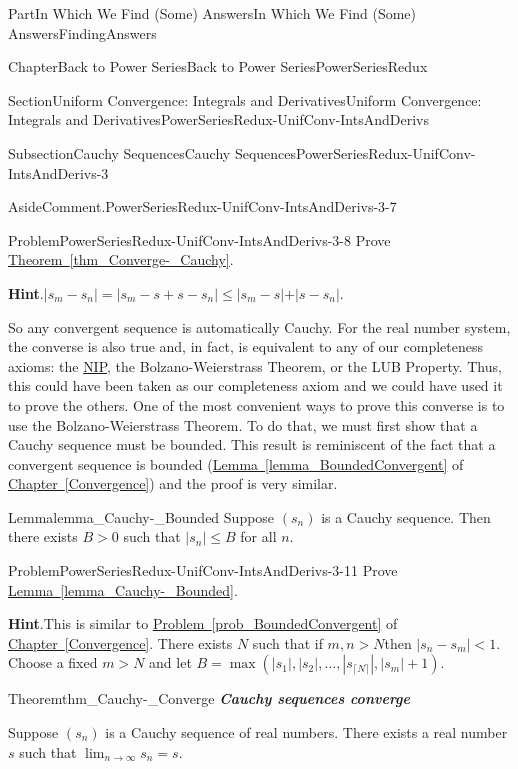 \documentclass[oneside,10pt,]{book}
\newcommand{\blocktitlefont}{\relax}
\newcommand{\xreffont}{\relax}
\newcommand{\alert}[1]{\textbf{\textit{#1}}}
\numberwithin{equation}{part}
\newcommand{\abs}[1]{\left|#1\right|}
\newcommand{\lt}{<}
\begin{document}
\begin{partptx}{Part}{In Which We Find (Some) Answers}{}{In Which We Find (Some) Answers}{}{}{FindingAnswers}
\begin{chapterptx}{Chapter}{Back to Power Series}{}{Back to Power Series}{}{}{PowerSeriesRedux}
\begin{sectionptx}{Section}{Uniform Convergence: Integrals and Derivatives}{}{Uniform Convergence: Integrals and Derivatives}{}{}{PowerSeriesRedux-UnifConv-IntsAndDerivs}
\begin{subsectionptx}{Subsection}{Cauchy Sequences}{}{Cauchy Sequences}{}{}{PowerSeriesRedux-UnifConv-IntsAndDerivs-3}
\begin{aside}{Aside}{Comment.}{PowerSeriesRedux-UnifConv-IntsAndDerivs-3-7}
\end{aside}
\begin{problem}{Problem}{}{PowerSeriesRedux-UnifConv-IntsAndDerivs-3-8}%
Prove \hyperref[thm_Converge-_Cauchy]{Theorem~{\xreffont\ref{thm_Converge-_Cauchy}}}.%
\par\smallskip%
\noindent\textbf{\blocktitlefont Hint}.\hypertarget{PowerSeriesRedux-UnifConv-IntsAndDerivs-3-8-4}{}\quad{}\(|s_m-s_n|=|s_m-s+s-s_n|\leq|s_m-s\mathopen|+|s-s_n|\).%
\end{problem}
So any convergent sequence is automatically Cauchy.  For the real number system, the converse is also true and, in fact, is equivalent to any of our completeness axioms: the \hyperref[NIP]{NIP}, the Bolzano-Weierstrass Theorem, or the LUB Property.  Thus, this could have been taken as our completeness axiom and we could have used it to prove the others.  One of the most convenient ways to prove this converse is to use the Bolzano-Weierstrass Theorem.  To do that, we must first show that a Cauchy sequence must be bounded.  This result is reminiscent of the fact that a convergent sequence is bounded (\hyperref[lemma_BoundedConvergent]{Lemma~{\xreffont\ref{lemma_BoundedConvergent}}} of \hyperref[Convergence]{Chapter~{\xreffont\ref{Convergence}}}) and the proof is very similar.%
\begin{lemma}{Lemma}{}{}{lemma_Cauchy-_Bounded}%
Suppose \(\left(s_n\right)\) \(\)is a Cauchy sequence.  Then there exists \(B>0\) such that \(|s_n|\leq B\) for all \(n\).%
\end{lemma}
\begin{problem}{Problem}{}{PowerSeriesRedux-UnifConv-IntsAndDerivs-3-11}%
Prove \hyperref[lemma_Cauchy-_Bounded]{Lemma~{\xreffont\ref{lemma_Cauchy-_Bounded}}}.%
\par\smallskip%
\noindent\textbf{\blocktitlefont Hint}.\hypertarget{PowerSeriesRedux-UnifConv-IntsAndDerivs-3-11-3}{}\quad{}This is similar to \hyperref[prob_BoundedConvergent]{Problem~{\xreffont\ref{prob_BoundedConvergent}}} of \hyperref[Convergence]{Chapter~{\xreffont\ref{Convergence}}}.  There exists \(N\) such that if \(m,n>N\)then \(|s_n-s_m|\lt
1\). Choose a fixed \(m>N\) and let \(B=\max\left(\abs{s_1}, \abs{s_2}, \ldots,
\abs{s_{\lceil N\rceil}}, \abs{s_m}+1\right)\).%
\end{problem}
\begin{theorem}{Theorem}{}{}{thm_Cauchy-_Converge}%
\alert{Cauchy sequences converge}%
\par
{} Suppose \(\left(s_n\right)\) is a Cauchy sequence of real numbers.  There exists a real number \(s\) such that \(\lim_{n\rightarrow\infty}s_n=s\).%

\end{theorem}
\end{subsectionptx}
\end{sectionptx}
\end{chapterptx}
\end{partptx}
\end{document}
